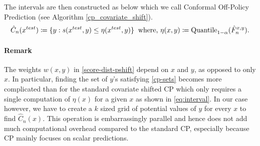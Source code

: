The intervals are then constructed as below which we call Conformal Off-Policy Prediction (see Algorithm \ref{cp_covariate_shift}).
\begin{align}
    \hat{C}_n(x^{test}) \coloneqq \{y: s(x^{test},y) \leq \eta(x^{test}, y)\} \hspace{0.2cm} \textup{where, }  \eta(x, y) \coloneqq \text{Quantile}_{1-\alpha}( \hat{F}_{n}^{x, y}). \label{cp-sets}
\end{align}

\paragraph{Remark}
    The weights $w(x, y)$ in \eqref{score-dist-pshift} depend on $x$ and $y$, as opposed to only $x$. In particular, finding the set of $y$'s satisfying \eqref{cp-sets} becomes more complicated than for the standard covariate shifted CP which only requires a single computation of $\eta(x)$ for a given $x$ as shown in \eqref{eq:interval}. In our case however, we have to create a $k$ sized grid of potential values of $y$ for every $x$ to find $\hat{C}_n(x)$. This operation is embarrassingly parallel and hence does not add much computational overhead compared to the standard CP, especially because CP mainly focuses on scalar predictions.


